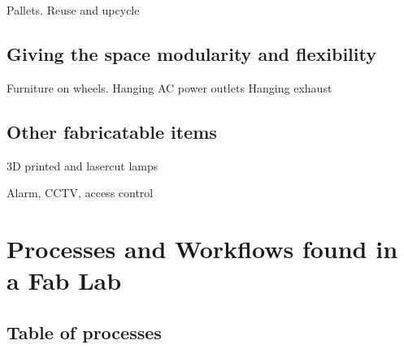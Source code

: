 \documentclass[a4paper,12pt,titlepage]{article}
\begin{document}
Pallets. Reuse and upcycle

\subsection{Giving the space modularity and flexibility}

Furniture on wheels. 
Hanging AC power outlets
Hanging exhaust

\subsection{Other fabricatable items}

3D printed and lasercut lamps

Alarm, CCTV, access control










\clearpage  
\section{Processes and Workflows found in a Fab Lab}

\subsection{Table of processes}
\end{document}
